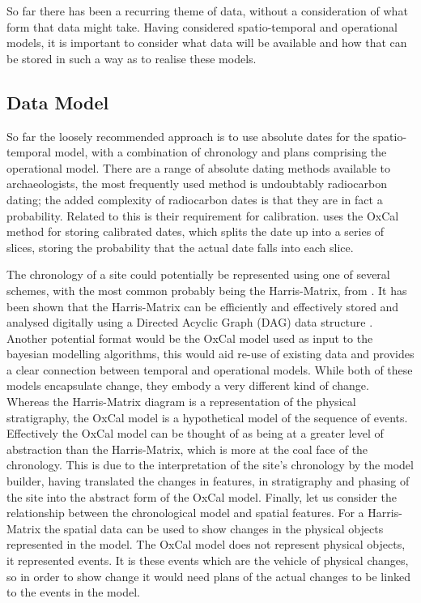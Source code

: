 So far there has been a recurring theme of data, without a consideration of what form that data might take. Having considered spatio-temporal and operational models, it is important to consider what data will be available and how that can be stored in such a way as to realise these models.

\subsection{Data Model}
So far the loosely recommended approach is to use absolute dates for the spatio-temporal model, with a combination of chronology and plans comprising the operational model. There are a range of absolute dating methods available to archaeologists, the most frequently used method is undoubtably radiocarbon dating; the added complexity of radiocarbon dates is that they are in fact a probability. Related to this is their requirement for calibration. \citet{Green:2008fk} uses the OxCal method for storing calibrated dates, which splits the date up into a series of slices, storing the probability that the actual date falls into each slice. 

The chronology of a site could potentially be represented using one of several schemes, with the most common probably being the Harris-Matrix, from \citet{Harris:1989vn}. It has been shown that the Harris-Matrix can be efficiently and effectively stored and analysed digitally using a Directed Acyclic Graph (DAG) data structure \citep{Ryan:1988ly,Herzog:1991ve}. Another potential format would be the OxCal model used as input to the bayesian modelling algorithms, this would aid re-use of existing data and provides a clear connection between temporal and operational models. While both of these models encapsulate change, they embody a very different kind of change. Whereas the Harris-Matrix diagram is a representation of the physical stratigraphy, the OxCal model is a hypothetical model of the sequence of events. Effectively the OxCal model can be thought of as being at a greater level of abstraction than the Harris-Matrix, which is more at the coal face of the chronology. This is due to the interpretation of the site's chronology by the model builder, having translated the changes in features, in stratigraphy and phasing of the site into the abstract form of the OxCal model. Finally, let us consider the relationship between the chronological model and spatial features. For a Harris-Matrix the spatial data can be used to show changes in the physical objects represented in the model. The OxCal model does not represent physical objects, it represented events. It is these events which are the vehicle of physical changes, so in order to show change it would need plans of the actual changes to be linked to the events in the model.

